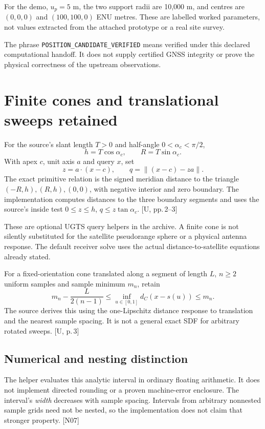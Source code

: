 \documentclass[11pt,a4paper]{article}
\newcommand{\code}[1]{\texttt{#1}}
\newcommand{\src}[1]{\textcolor{muted}{[U, #1]}}
\newcommand{\dec}[1]{\textcolor{accent}{[N#1]}}
\begin{document}
For the demo, $u_p=5$ m, the two support radii are 10,000 m, and centres are
$(0,0,0)$ and $(100,100,0)$ ENU metres. These are labelled worked parameters, not values
extracted from the attached prototype or a real site survey.

The phrase \code{POSITION\_CANDIDATE\_VERIFIED} means verified under this declared
computational handoff. It does not supply certified GNSS integrity or prove the
physical correctness of the upstream observations.
\clearpage

\section{Finite cones and translational sweeps retained}
For the source's slant length $T>0$ and half-angle $0<\alpha_c<\pi/2$,
\begin{equation}
h=T\cos\alpha_c,\qquad R=T\sin\alpha_c.
\end{equation}
With apex $c$, unit axis $a$ and query $x$, set
\begin{equation}
z=a\cdot(x-c),\qquad q=\|(x-c)-za\|.
\end{equation}
The exact primitive relation is the signed meridian distance to the triangle
$(-R,h),(R,h),(0,0)$, with negative interior and zero boundary. The implementation
computes distances to the three boundary segments and uses the source's inside test
$0\le z\le h$, $q\le z\tan\alpha_c$. \src{pp.\,2--3}

These are optional UGTS query helpers in the archive. A finite cone is not silently
substituted for the satellite pseudorange sphere or a physical antenna response.
The default receiver solve uses the actual distance-to-satellite equations already stated.

For a fixed-orientation cone translated along a segment of length $L$, $n\ge2$ uniform
samples and sample minimum $m_n$, retain
\begin{equation}
m_n-\frac{L}{2(n-1)}\le\inf_{u\in[0,1]}d_C(x-s(u))\le m_n.
\end{equation}
The source derives this using the one-Lipschitz distance response to translation and
the nearest sample spacing. It is not a general exact SDF for arbitrary rotated sweeps.
\src{p.\,3}

\subsection{Numerical and nesting distinction}
The helper evaluates this analytic interval in ordinary floating arithmetic. It does
not implement directed rounding or a proven machine-error enclosure. The interval's
\emph{width} decreases with sample spacing. Intervals from arbitrary nonnested sample
grids need not be nested, so the implementation does not claim that stronger property.
\dec{07}
\end{document}
